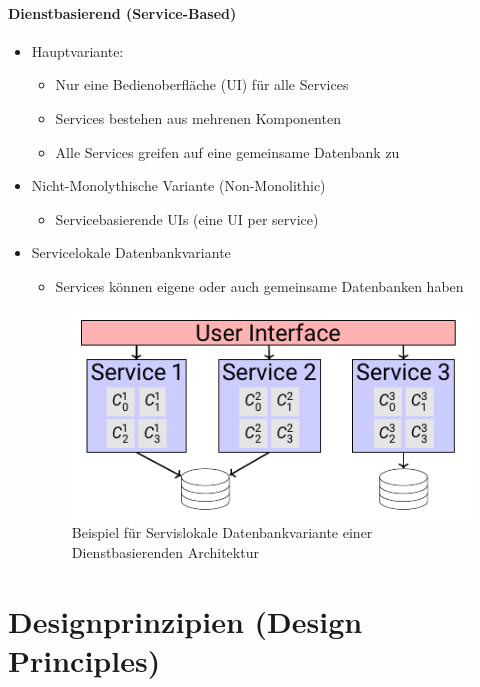 \documentclass[ngerman,color=3b]{tuda_summary}
\begin{document}
\paragraph{Dienstbasierend (Service-Based)}
\begin{itemize}
    \item Hauptvariante: \begin{itemize}
              \item Nur eine Bedienoberfläche (UI) für alle Services
              \item Services bestehen aus mehrenen Komponenten
              \item Alle Services greifen auf eine gemeinsame Datenbank zu
          \end{itemize}
    \item Nicht-Monolythische Variante (Non-Monolithic)\begin{itemize}
              \item Servicebasierende UIs (eine UI per service)
          \end{itemize}
    \item Servicelokale Datenbankvariante\begin{itemize}
              \item Services können eigene oder auch gemeinsame Datenbanken haben
          \end{itemize}
          \begin{figure}[ht]
              \centering
              \includegraphics{bilder/service_local_service_based_architecture_style.pdf}
              \caption{Beispiel für Servislokale Datenbankvariante einer Dienstbasierenden Architektur}
          \end{figure}
\end{itemize}

\clearpage
\section{Designprinzipien (Design Principles)}
\end{document}
